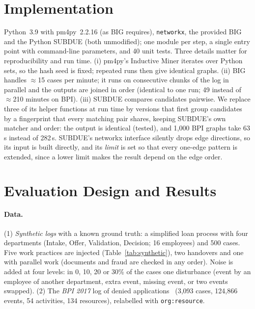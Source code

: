 \documentclass{article}
\begin{document}
\section{Implementation}\label{sec:implementation}
Python~3.9 with pm4py~2.2.16 (as BIG requires), \texttt{networkx}, the provided
BIG and the Python SUBDUE (both unmodified); one module per step, a single
entry point with command-line parameters, and 40 unit tests. Three details
matter for reproducibility and run time. (i) pm4py's Inductive Miner iterates
over Python sets, so the hash seed is fixed; repeated runs then give identical
graphs. (ii) BIG handles $\approx$15 cases per minute; it runs on consecutive
chunks of the log in parallel and the outputs are joined in order (identical to
one run; 49 instead of $\approx$210 minutes on BPI). (iii) SUBDUE compares
candidates pairwise. We replace three of its helper functions at run time by
versions that first group candidates by a fingerprint that every matching pair
shares, keeping SUBDUE's own matcher and order: the output is identical
(tested), and 1,000 BPI graphs take 63\,s instead of 282\,s. SUBDUE's networkx
interface silently drops edge directions, so its input is built directly, and
its \emph{limit} is set so that every one-edge pattern is extended, since a
lower limit makes the result depend on the edge order.

\section{Evaluation Design and Results}\label{sec:evaluation}

\paragraph{Data.} (1) \emph{Synthetic logs} with a known ground truth: a
simplified loan process with four departments (Intake, Offer, Validation,
Decision; 16 employees) and 500 cases. Five work practices are injected
(Table~\ref{tab:synthetic}), two handovers and one with parallel work
(documents and fraud are checked in any order). Noise is added at four levels:
in 0, 10, 20 or 30\% of the cases one disturbance (event by an employee of
another department, extra event, missing event, or two events swapped). (2) The
\emph{BPI 2017} log of denied applications~\cite{vandongen2017bpi} (3,093 cases,
124,866 events, 54 activities, 134 resources), relabelled with
\texttt{org:resource}.
\end{document}

